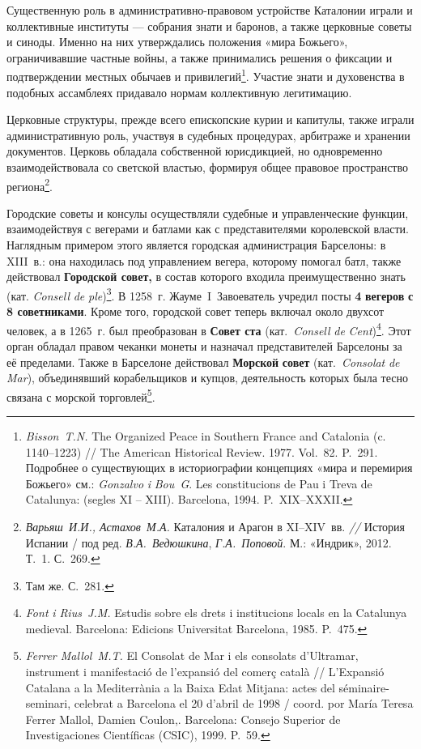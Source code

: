Существенную роль в административно-правовом устройстве Каталонии играли и коллективные институты --- собрания знати и баронов, а также церковные советы и синоды. Именно на них утверждались положения «мира Божьего», ограничивавшие частные войны, а также принимались решения о фиксации и подтверждении местных обычаев и привилегий\footnote{\emph{Bisson}~\emph{T.}\emph{N}\emph{.} The Organized Peace in Southern France and Catalonia (c. 1140--1223) // The American Historical Review. 1977. Vol.~82. P.~291. Подробнее о существующих в историографии концепциях «мира и перемирия Божьего» см.: \emph{Gonzalvo }\emph{i}\emph{ Bou}\emph{~}\emph{G}. Les constitucions de Pau i Treva de Catalunya: (segles XI -- XIII). Barcelona, 1994. P.~XIX--XXXII.}. Участие знати и духовенства в подобных ассамблеях придавало нормам коллективную легитимацию.

Церковные структуры, прежде всего епископские курии и капитулы, также играли административную роль, участвуя в судебных процедурах, арбитраже и хранении документов. Церковь обладала собственной юрисдикцией, но одновременно взаимодействовала со светской властью, формируя общее правовое пространство региона\footnote{\emph{Варьяш}\emph{~И.И., Астахов~М.А.} Каталония и Арагон в XI--XIV~вв. \emph{// }История Испании / под ред. \emph{В.А.~Ведюшкина}, \emph{Г.А.~Поповой}. М.: «Индрик», 2012. Т.~1. С.~269.}.

Городские советы и консулы осуществляли судебные и управленческие функции, взаимодействуя с вегерами и батлами как с представителями королевской власти. Наглядным примером этого является городская администрация Барселоны: в XIII~в.: она находилась под управлением вегера, которому помогал батл, также действовал \textbf{Г}\textbf{ородской совет,} в состав которого входила преимущественно знать (кат. \emph{Consell}\emph{ de }\emph{ple})\footnote{Там же. С.~281.}. В 1258~г. Жауме~I~Завоеватель учредил посты \textbf{4}\textbf{ }\textbf{вегеров}\textbf{ с 8 советниками}. Кроме того, городской совет теперь включал около двухсот человек, а в 1265~г. был преобразован в \textbf{Совет ста} (кат.~\emph{Consell}\emph{ de }\emph{Cent})\footnote{\emph{Font }\emph{i Rius}\emph{~}\emph{J.M.} Estudis sobre els drets i institucions locals en la Catalunya medieval. Barcelona: Edicions Universitat Barcelona, 1985. P.~475.}. Этот орган обладал правом чеканки монеты и назначал представителей Барселоны за её пределами. Также в Барселоне действовал \textbf{Морско}\textbf{й}\textbf{ совет} (кат.~\emph{Consolat}\emph{ de }\emph{Mar}), объединявший корабельщиков и купцов, деятельность которых была тесно связана с морской торговлей\footnote{\emph{Ferrer Mallol}\emph{~}\emph{M.T. }El Consolat de Mar i els consolats d’Ultramar, instrument i manifestació de l’expansió del comerç català // L'Expansió Catalana a la Mediterrània a la Baixa Edat Mitjana: actes del séminaire-seminari, celebrat a Barcelona el 20 d'abril de 1998 / coord. por María Teresa Ferrer Mallol, Damien Coulon,. Barcelona: Consejo Superior de Investigaciones Científicas (CSIC), 1999. P.~59.}.

